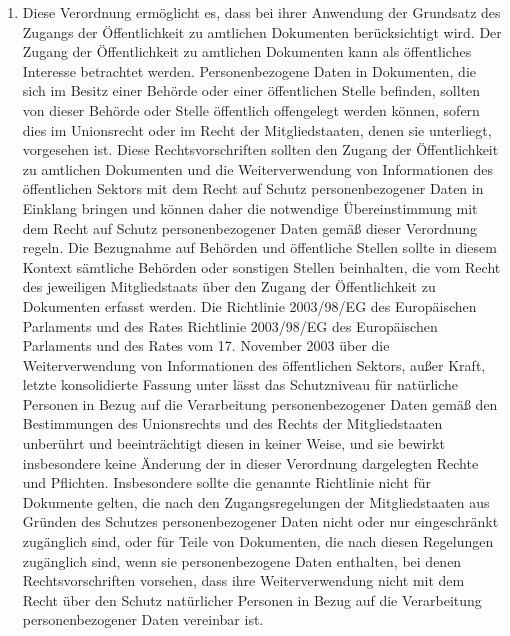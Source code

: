 \begin{enumerate}
   \item Diese Verordnung ermöglicht es, dass bei ihrer Anwendung der Grundsatz des Zugangs der Öffentlichkeit zu
    amtlichen Dokumenten berücksichtigt wird. Der Zugang der Öffentlichkeit zu amtlichen Dokumenten kann als
    öffentliches Interesse betrachtet werden. Personenbezogene Daten in Dokumenten, die sich im Besitz einer Behörde
    oder einer öffentlichen Stelle befinden, sollten von dieser Behörde oder Stelle öffentlich offengelegt werden
    können, sofern dies im Unionsrecht oder im Recht der Mitgliedstaaten, denen sie unterliegt, vorgesehen ist. Diese
    Rechtsvorschriften sollten den Zugang der Öffentlichkeit zu amtlichen Dokumenten und die Weiterverwendung von
    Informationen des öffentlichen Sektors mit dem Recht auf Schutz personenbezogener Daten in Einklang bringen und
    können daher die notwendige Übereinstimmung mit dem Recht auf Schutz personenbezogener Daten gemäß dieser
    Verordnung regeln. Die Bezugnahme auf Behörden und öffentliche Stellen sollte in diesem Kontext sämtliche Behörden
    oder sonstigen Stellen beinhalten, die vom Recht des jeweiligen Mitgliedstaats über den Zugang der Öffentlichkeit
    zu Dokumenten erfasst werden. Die Richtlinie 2003/98/EG des Europäischen Parlaments und des Rates\comment
    {Richtlinie 2003/98/EG des Europäischen Parlaments und des Rates vom 17. November 2003 über die Weiterverwendung
    von Informationen des öffentlichen Sektors, außer Kraft, letzte konsolidierte Fassung unter \cite
    {ril-wvi-os}} lässt das Schutzniveau für natürliche Personen in Bezug auf die Verarbeitung personenbezogener Daten
    gemäß den Bestimmungen des Unionsrechts und des Rechts der Mitgliedstaaten unberührt und beeinträchtigt diesen in
    keiner Weise, und sie bewirkt insbesondere keine Änderung der in dieser Verordnung dargelegten Rechte und
    Pflichten. Insbesondere sollte die genannte Richtlinie nicht für Dokumente gelten, die nach den Zugangsregelungen
    der Mitgliedstaaten aus Gründen des Schutzes personenbezogener Daten nicht oder nur eingeschränkt zugänglich sind,
    oder für Teile von Dokumenten, die nach diesen Regelungen zugänglich sind, wenn sie personenbezogene Daten
    enthalten, bei denen Rechtsvorschriften vorsehen, dass ihre Weiterverwendung nicht mit dem Recht über den Schutz
    natürlicher Personen in Bezug auf die Verarbeitung personenbezogener Daten vereinbar ist.%
   \label{itm:eg-154}
   


\end{enumerate}
